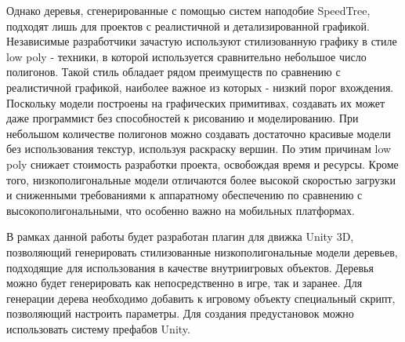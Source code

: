 Однако деревья, сгенерированные с помощью систем наподобие SpeedTree, подходят лишь для проектов с реалистичной и детализированной графикой. Независимые разработчики зачастую используют стилизованную графику в стиле low poly - техники, в которой используется сравнительно небольшое число полигонов. Такой стиль обладает рядом преимуществ по сравнению с реалистичной графикой, наиболее важное из которых - низкий порог вхождения. Поскольку модели построены на графических примитивах, создавать их может даже программист без способностей к рисованию и моделированию. При небольшом количестве полигонов можно создавать достаточно красивые модели без использования текстур, используя раскраску вершин. По этим причинам low poly снижает стоимость разработки проекта, освобождая время и ресурсы. Кроме того, низкополигональные модели отличаются более высокой скоростью загрузки и сниженными требованиями к аппаратному обеспечению по сравнению с высокополигональными, что особенно важно на мобильных платформах. \cite{LowPolyIntro} 

В рамках данной работы будет разработан плагин для движка Unity 3D, позволяющий генерировать стилизованные низкополигональные модели деревьев, подходящие для использования в качестве внутриигровых объектов. Деревья можно будет генерировать как непосредственно в игре, так и заранее. Для генерации дерева необходимо добавить к игровому объекту специальный скрипт, позволяющий настроить параметры. Для создания предустановок можно использовать систему префабов Unity.
 
\newpage
